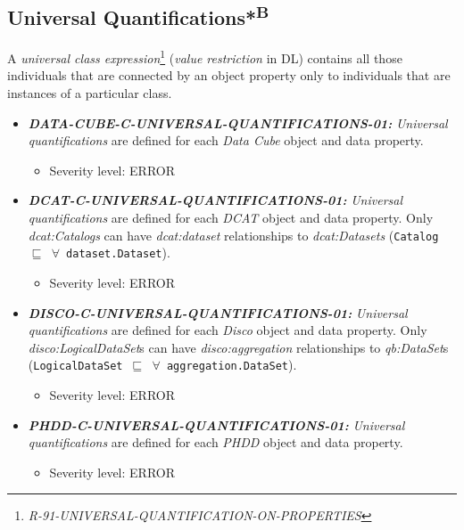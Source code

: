 \documentclass{llncs}
\newcommand{\ms}[1]{\texttt{#1}}
\begin{document}
\subsection{Universal Quantifications*\textsuperscript{B}}

A \emph{universal class expression}\footnote{{\em R-91-UNIVERSAL-QUANTIFICATION-ON-PROPERTIES}} ({\em value restriction} in DL) contains all those individuals that are connected by an object property only to individuals that are instances of a particular class.

\begin{itemize}
	\item \textbf{{\em DATA-CUBE-C-UNIVERSAL-QUANTIFICATIONS-01:}}
	\emph{Universal quantifications} are defined for each \emph{Data Cube} object and data property.
	\begin{itemize}
		\item Severity level: ERROR
	\end{itemize}
\end{itemize}

\begin{itemize}
	\item \textbf{{\em DCAT-C-UNIVERSAL-QUANTIFICATIONS-01:}}
	\emph{Universal quantifications} are defined for each \emph{DCAT} object and data property.
	Only {\em dcat:Catalogs} can have {\em dcat:dataset} relationships to {\em dcat:Datasets} (\ms{Catalog $\sqsubseteq$ $\forall$ dataset.Dataset}).
	\begin{itemize}
		\item Severity level: ERROR
	\end{itemize}
\end{itemize}

\begin{itemize}
	\item \textbf{{\em DISCO-C-UNIVERSAL-QUANTIFICATIONS-01:}}
	\emph{Universal quantifications} are defined for each \emph{Disco} object and data property.
  Only {\em disco:LogicalDataSet}s can have {\em disco:aggregation} relationships to {\em qb:DataSet}s (\ms{LogicalDataSet $\sqsubseteq$ $\forall$ aggregation.DataSet}).
	\begin{itemize}
		\item Severity level: ERROR
	\end{itemize}
\end{itemize}

\begin{itemize}
	\item \textbf{{\em PHDD-C-UNIVERSAL-QUANTIFICATIONS-01:}}
	\emph{Universal quantifications} are defined for each \emph{PHDD} object and data property.
	\begin{itemize}
		\item Severity level: ERROR
	\end{itemize}
\end{itemize}
\end{document}
